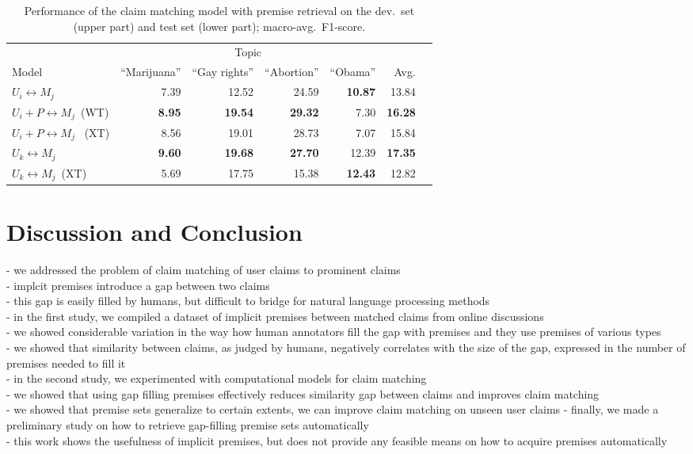 \begin{table}
\begin{center}
{\small
\setlength{\tabcolsep}{4.8pt}
\begin{tabular}{lrrrrrr}
\toprule
&\multicolumn{4}{c}{Topic}\\
\cmidrule(lr){2-5}
Model & ``Marijuana'' & ``Gay rights''  & ``Abortion'' & ``Obama'' & Avg. \\
\midrule
$U_i \leftrightarrow M_j$ & 7.39          & 12.52        & 24.59       & {\bf 10.87} & 13.84 \\
$U_i + P \leftrightarrow M_j$\ (WT)     & {\bf 8.95}    & {\bf 19.54}  & {\bf 29.32} & 7.30        & {\bf 16.28} \\
$U_i + P \leftrightarrow M_j$ \ (XT)   & 8.56          & 19.01        & 28.73       & 7.07        & 15.84 \\
\midrule
$U_k \leftrightarrow M_j$            & {\bf 9.60}   & {\bf 19.68}   & {\bf 27.70} & 12.39       & {\bf 17.35} \\
$U_k \leftrightarrow M_j$\ (XT)  & 5.69         &  17.75        & 15.38       & {\bf 12.43} & 12.82 \\
\bottomrule
\end{tabular}}
\caption{Performance of the claim matching model with premise retrieval on the
dev.~set (upper part) and test set (lower part); macro-avg.~F1-score.}
\label{tab:argpremise_retrieval}
\end{center}
\end{table}

\section{Discussion and Conclusion}

- we addressed the problem of claim matching of user claims to prominent claims \\
- implcit premises introduce a gap between two claims \\
- this gap is easily filled by humans, but difficult to bridge for natural language processing 
methods \\
- in the first study, we compiled a dataset of implicit premises between matched claims from 
online discussions \\
- we showed considerable variation in the way how human annotators fill the gap with premises and they
use premises of various types \\
- we showed that similarity between claims, as judged by humans, negatively correlates with the size
of the gap, expressed in the number of premises needed to fill it \\
- in the second study, we experimented with computational models for claim matching \\
- we showed that using gap filling premises effectively reduces similarity gap between claims 
and improves claim matching \\
- we showed that premise sets generalize to certain extents, we can improve claim matching
on unseen user claims 
- finally, we made a preliminary study on how to retrieve gap-filling premise sets automatically \\

- this work shows the usefulness of implicit premises, but does not provide any
feasible means on how to acquire premises automatically \\
